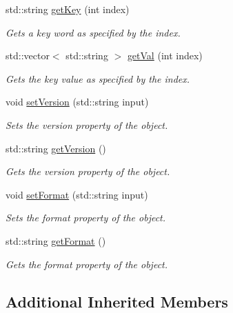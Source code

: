 \begin{DoxyCompactItemize}
std\-::string \hyperlink{classosea_1_1_object_group_a818bd77a51e5617fb26481d09eb16714}{get\-Key} (int index)
\begin{DoxyCompactList}\small\item\em Gets a key word as specified by the index. \end{DoxyCompactList}\item 
std\-::vector$<$ std\-::string $>$ \hyperlink{classosea_1_1_object_group_a35ccc728179fdc3db8712f553746caf9}{get\-Val} (int index)
\begin{DoxyCompactList}\small\item\em Gets the key value as specified by the index. \end{DoxyCompactList}\item 
void \hyperlink{classosea_1_1_object_group_a33955b7630b2709483c2f635cbff2ac7}{set\-Version} (std\-::string input)
\begin{DoxyCompactList}\small\item\em Sets the version property of the object. \end{DoxyCompactList}\item 
std\-::string \hyperlink{classosea_1_1_object_group_aa3603cc9c8ae5a0d3e1dc73cc531cb6b}{get\-Version} ()
\begin{DoxyCompactList}\small\item\em Gets the version property of the object. \end{DoxyCompactList}\item 
void \hyperlink{classosea_1_1_object_group_a41a1aa49d18643e322f0ca1917c08bff}{set\-Format} (std\-::string input)
\begin{DoxyCompactList}\small\item\em Sets the format property of the object. \end{DoxyCompactList}\item 
std\-::string \hyperlink{classosea_1_1_object_group_a8e08f57a3e0bcaa7e81ba45173ef6e55}{get\-Format} ()
\begin{DoxyCompactList}\small\item\em Gets the format property of the object. \end{DoxyCompactList}\end{DoxyCompactItemize}
\subsection*{Additional Inherited Members}


